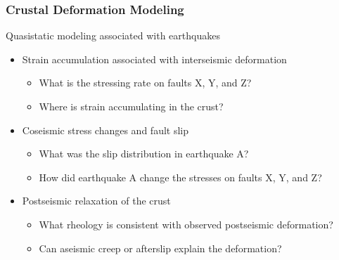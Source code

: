 \documentclass{beamer}
\begin{document}
\begin{frame}
  \frametitle{Crustal Deformation Modeling}

  \vfill
  Quasistatic modeling associated with earthquakes
  \vfill

  \begin{itemize}
  \item Strain accumulation associated with interseismic deformation
    \begin{itemize}
    \item What is the stressing rate on faults X, Y, and Z?
    \item Where is strain accumulating in the crust?
    \end{itemize}
  \item Coseismic stress changes and fault slip
    \begin{itemize}
    \item What was the slip distribution in earthquake A?
    \item How did earthquake A change the stresses on faults X, Y, and Z?
    \end{itemize}
  \item Postseismic relaxation of the crust
    \begin{itemize}
    \item What rheology is consistent with observed postseismic deformation?
    \item Can aseismic creep or afterslip explain the deformation?
    \end{itemize}
  \end{itemize}
  \vfill

\end{frame}
\end{document}

